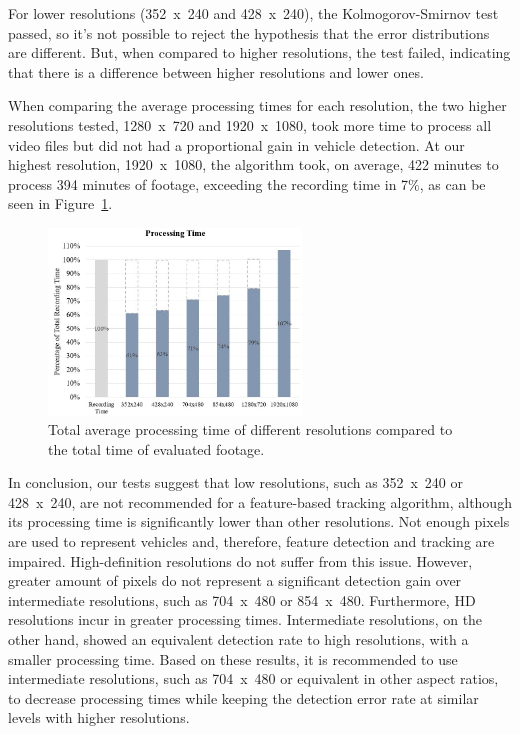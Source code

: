 \documentclass[article,12pt,a4paper,oneside,hidelinks]{memoir}
\begin{document}
For lower resolutions (352~x~240 and 428~x~240), the Kolmogorov-Smirnov test passed, so it’s not possible to reject the hypothesis that the error distributions are different. But, when compared to higher resolutions, the test failed, indicating that there is a difference between higher resolutions and lower ones.

When comparing the average processing times for each resolution, the two higher resolutions tested, 1280~x~720 and 1920~x~1080, took more time to process all video files but did not had a proportional gain in vehicle detection. At our highest resolution, 1920~x~1080, the algorithm took, on average, 422 minutes to process 394 minutes of footage, exceeding the recording time in 7\%, as can be seen in Figure~\ref{fig:fig6}.  

\begin{figure}[h]
	\centering
	\includegraphics[width=0.6\textwidth]{Figuras/fig6.jpg}
	\caption{Total average processing time of different resolutions compared to the total time of evaluated footage.}
	\label{fig:fig6}
\end{figure}

In conclusion, our tests suggest that low resolutions, such as 352~x~240 or 428~x~240, are not recommended for a feature-based tracking algorithm, although its processing time is significantly lower than other resolutions. Not enough pixels are used to represent vehicles and, therefore, feature detection and tracking are impaired. High-definition resolutions do not suffer from this issue. However, greater amount of pixels do not represent a significant detection gain over intermediate resolutions, such as 704~x~480 or 854~x~480. Furthermore, HD resolutions incur in greater processing times. Intermediate resolutions, on the other hand, showed an equivalent detection rate to high resolutions, with a smaller processing time. Based on these results, it is recommended to use intermediate resolutions, such as 704~x~480 or equivalent in other aspect ratios, to decrease processing times while keeping the detection error rate at similar levels with higher resolutions.  
\end{document}
